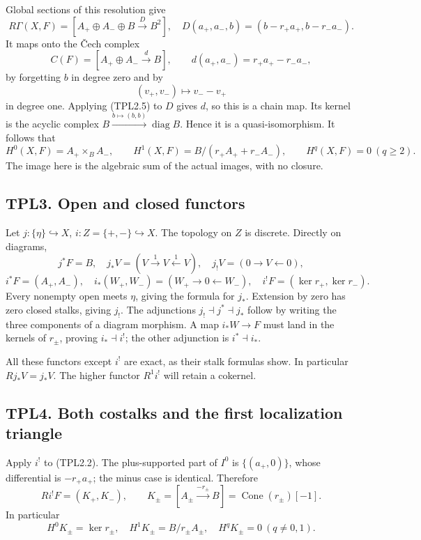 Global sections of this resolution give \[
R\Gamma(X,F)=
[A_+\oplus A_-\oplus B\xrightarrow D B^2],
\quad D(a_+,a_-,b)=(b-r_+a_+,b-r_-a_-).
\tag{TPL2.3}
\] It maps onto the Čech complex \[
C(F)=[A_+\oplus A_-\xrightarrow d B],
\qquad d(a_+,a_-)=r_+a_+-r_-a_-,
\tag{TPL2.4}
\] by forgetting \(b\) in degree zero and by \[
(v_+,v_-)\mapsto v_--v_+
\tag{TPL2.5}
\] in degree one. Applying (TPL2.5) to \(D\) gives \(d\), so this is a
chain map. Its kernel is the acyclic complex
\(B\xrightarrow{b\mapsto(b,b)}\operatorname{diag}B\). Hence it is a
quasi-isomorphism. It follows that \[
H^0(X,F)=A_+\times_BA_-,\qquad
H^1(X,F)=B/(r_+A_++r_-A_-),\qquad H^q(X,F)=0\ (q\ge2).
\tag{TPL2.6}
\] The image here is the algebraic sum of the actual images, with no
closure.

\subsection{TPL3. Open and closed
functors}\label{tpl3.-open-and-closed-functors}

Let \(j:\{\eta\}\hookrightarrow X\), \(i:Z=\{+,-\}\hookrightarrow X\).
The topology on \(Z\) is discrete. Directly on diagrams, \[
j^*F=B,\quad j_*V=(V\xrightarrow1V\xleftarrow1V),
\quad j_!V=(0\to V\leftarrow0),
\tag{TPL3.1}
\] \[
i^*F=(A_+,A_-),\quad
i_*(W_+,W_-)=(W_+\to0\leftarrow W_-),\quad
i^!F=(\ker r_+,\ker r_-).
\tag{TPL3.2}
\] Every nonempty open meets \(\eta\), giving the formula for \(j_*\).
Extension by zero has zero closed stalks, giving \(j_!\). The
adjunctions \(j_!\dashv j^*\dashv j_*\) follow by writing the three
components of a diagram morphism. A map \(i_*W\to F\) must land in the
kernels of \(r_\pm\), proving \(i_*\dashv i^!\); the other adjunction is
\(i^*\dashv i_*\).

All these functors except \(i^!\) are exact, as their stalk formulas
show. In particular \(Rj_*V=j_*V\). The higher functor \(R^1i^!\) will
retain a cokernel.

\subsection{TPL4. Both costalks and the first localization
triangle}\label{tpl4.-both-costalks-and-the-first-localization-triangle}

Apply \(i^!\) to (TPL2.2). The plus-supported part of \(I^0\) is
\(\{(a_+,0)\}\), whose differential is \(-r_+a_+\); the minus case is
identical. Therefore \[
Ri^!F=(K_+,K_-),\qquad
K_\pm=[A_\pm\xrightarrow{-r_\pm}B]
=\operatorname{Cone}(r_\pm)[-1].
\tag{TPL4.1}
\] In particular \[
H^0K_\pm=\ker r_\pm,\quad H^1K_\pm=B/r_\pm A_\pm,
\quad H^qK_\pm=0\ (q\ne0,1).
\tag{TPL4.2}
\]

